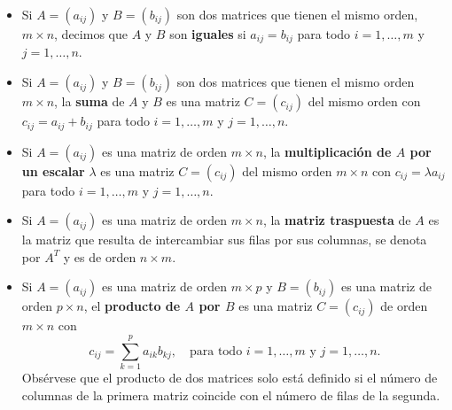 \documentclass[12pt]{article}
\begin{document}
\begin{itemize}
\item Si $ A = (a_{ij}) $ y $ B = (b_{ij}) $ son dos matrices que tienen el mismo orden, $ m \times n $, decimos que $ A $ y $ B $ son \textbf{iguales} si $ a_{ij} = b_{ij} $ para todo $ i = 1, \ldots, m $ y $ j = 1, \ldots, n $.

\item Si $ A = (a_{ij}) $ y $ B = (b_{ij}) $ son dos matrices que tienen el mismo orden $ m \times n $, la \textbf{suma} de $ A $ y $ B $ es una matriz $ C = (c_{ij}) $ del mismo orden con $ c_{ij} = a_{ij} + b_{ij} $ para todo $ i = 1, \ldots, m $ y $ j = 1, \ldots, n $.

\item Si $ A = (a_{ij}) $ es una matriz de orden $ m \times n $, la \textbf{multiplicación de $ A $ por un escalar} $ \lambda $ es una matriz $ C = (c_{ij}) $ del mismo orden $ m \times n $ con $ c_{ij} = \lambda a_{ij} $ para todo $ i = 1, \ldots, m $ y $ j = 1, \ldots, n $.

\item Si $ A = (a_{ij}) $ es una matriz de orden $ m \times n $, la \textbf{matriz traspuesta} de $ A $ es la matriz que resulta de intercambiar sus filas por sus columnas, se denota por $ A^T $ y es de orden $ n \times m $.

\item Si $ A = (a_{ij}) $ es una matriz de orden $ m \times p $ y $ B = (b_{ij}) $ es una matriz de orden $ p \times n $, el \textbf{producto de $ A $ por $ B $} es una matriz $ C = (c_{ij}) $ de orden $ m \times n $ con $$c_{ij} = \sum_{k=1}^p a_{ik}b_{kj}, \quad \text{para todo } i = 1, \ldots, m \text{ y } j = 1, \ldots, n.$$ Obsérvese que el producto de dos matrices solo está definido si el número de columnas de la primera matriz coincide con el número de filas de la segunda.
\end{itemize}

\end{document}
